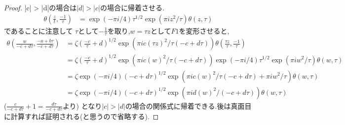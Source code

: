 \begin{proof}
|c| > |d|の場合は$|d| > |c|$の場合に帰着させる.
\begin{align*}
\theta(\frac{z}{t}, \frac{-1}{\tau})  
& = \exp(- \pi i /4) \tau^{1/2} \exp(\pi i z^2 / \tau) \theta(z, \tau)
\end{align*}
であることに注意して
$\tau$として$- \frac{1}{\tau}$を取り,$w= \tau z$として$F1$を変形させると,
\begin{align*}
\theta \left( \frac{w}{-c + d \tau}, \frac{-a + b \tau}{-c + d \tau} \right) 
& = \zeta  (\frac{-c}{\tau} + d)^{1/2} \exp \left( \pi i c (\tau z)^2/ \tau( -c + d \tau) \right) \theta(\frac{\tau z}{\tau} , \frac{-1}{\tau}) \\
& = \zeta  (\frac{-c}{\tau} + d)^{1/2} \exp \left( \pi i c (w)^2/ \tau( -c + d \tau) \right) \exp(- \pi i /4) \tau^{1/2} \exp(\pi i w^2 / \tau) \theta(w, \tau) \\
& = \zeta  \exp(- \pi i /4) (-c + d \tau)^{1/2} \exp( \pi i c (w)^2/ \tau( -c + d \tau ) + \pi i w^2 / \tau) \theta(w, \tau) \\
& = \zeta  \exp(- \pi i /4) (-c + d \tau)^{1/2} \exp( \pi i d (w)^2/ ( -c + d \tau ) ) \theta(w, \tau)
\end{align*}
($ \frac{c}{-c + d \tau} + 1 =  \frac{d\tau}{ -c + d \tau}$より)
となり$|c| > |d|$の場合の関係式に帰着できる.後は真面目に計算すれば証明される(と思うので省略する).
\end{proof}